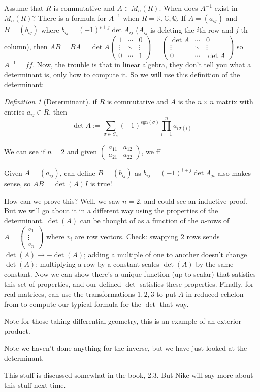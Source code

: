 \documentclass{article}
\theoremstyle{plain}
\theoremstyle{remark}
\newtheorem{definition}{Definition}
\newcommand{\Q}{{\mathbb Q}}
\newcommand{\R}{{\mathbb R}}
\newcommand{\C}{{\mathbb C}}
\begin{document}
Assume that $R$ is commutative and $A \in M_n(R)$.
When does $A^{-1}$ exist in $M_n(R)$?
There is a formula for $A^{-1}$ when $R = \R,\C,\Q$.
If $A = (a_{ij})$ and $B = (b_{ij})$ where $b_{ij} = (-1)^{i+j}\det{A_{ij}}$
($A_{ij}$ is deleting the $i$th row and $j$-th column),
then $AB = BA = \det{A}\begin{pmatrix} 1 & \cdots & 0 \\ \vdots & \ddots & \vdots\\
0 &\cdots &1\end{pmatrix} =
\begin{pmatrix} \det{A} & \cdots & 0 \\ \vdots & \ddots & \vdots\\
0 &\cdots &\det{A}\end{pmatrix}$
so $A^{-1} = ff$.
Now, the trouble is that in linear algebra,
they don't tell you what a determinant is,
only how to compute it.
So we will use this definition of the determinant:
\begin{definition}[Determinant]
	if $R$ is commutative and $A$ is the $n \times n$ matrix with entries $a_{ij} \in R$, then
	\[
		\det{A} := \sum_{\sigma \in S_n} (-1)^{\mathrm{sgn}(\sigma)}
		\prod_{i=1}^n a_{i \sigma(i)}
	\]
\end{definition}
We can see if $n = 2$ and given
$\begin{pmatrix} a_{11} & a_{12} \\ a_{21} & a_{22} \end{pmatrix}$,
we ff

Given $A = (a_{ij})$, can define $B = (b_{ij})$ as
$b_{ij} = (-1)^{i+j}\det{A_{ji}}$ also makes sense,
so $AB = \det(A)I$ is true!

How can we prove this? Well, we saw $n = 2$, and could see an inductive proof.
But we will go about it in a different way using the properties of the determinant.
$\det(A)$ can be thought of as a function of the $n$-rows of
$A = \begin{pmatrix} v_1 \\ \vdots \\ v_n \end{pmatrix}$ where
$v_i$ are row vectors.
Check: swapping $2$ rows sends $\det(A) \to -\det(A)$;
adding a multiple of one to another doesn't change $\det(A)$;
multiplying a row by a constant scales $\det(A)$ by the same constant.
Now we can show there's a unique function (up to scalar) that satisfies this set of properties,
and our defined $\det$ satisfies these properties.
Finally, for real matrices, can use the transformations $1,2,3$ to put $A$ in reduced echelon from
to compute our typical formula for the $\det$ that way.

Note for those taking differential geometry,
this is an example of an exterior product.

Note we haven't done anything for the inverse, but we have just looked at the determinant.

This stuff is discussed somewhat in the book, 2.3.
But Nike will say more about this stuff next time.
\end{document}
